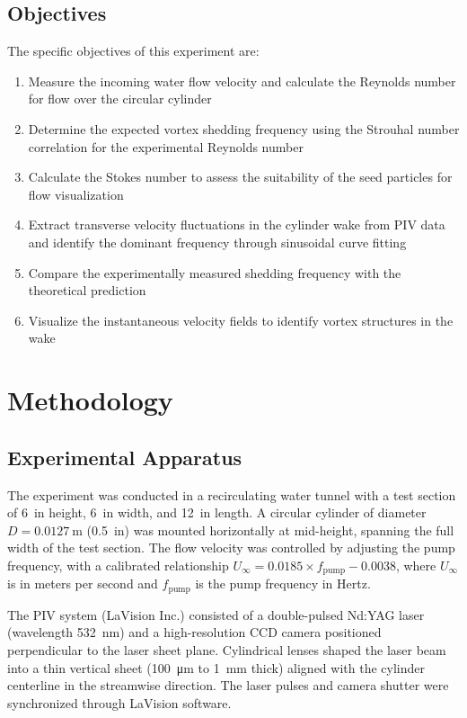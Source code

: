 \subsection{Objectives} \label{sec:introduction/objectives}

The specific objectives of this experiment are:
\begin{enumerate}
    \item Measure the incoming water flow velocity and calculate the Reynolds number for flow over the circular cylinder
    \item Determine the expected vortex shedding frequency using the Strouhal number correlation for the experimental Reynolds number
    \item Calculate the Stokes number to assess the suitability of the seed particles for flow visualization
    \item Extract transverse velocity fluctuations in the cylinder wake from PIV data and identify the dominant frequency through sinusoidal curve fitting
    \item Compare the experimentally measured shedding frequency with the theoretical prediction
    \item Visualize the instantaneous velocity fields to identify vortex structures in the wake
\end{enumerate}

\section{Methodology} \label{sec:methodology}

\subsection{Experimental Apparatus} \label{sec:methodology/apparatus}

The experiment was conducted in a recirculating water tunnel with a test section of \SI{6}{in} height, \SI{6}{in} width, and \SI{12}{in} length. A circular cylinder of diameter \(D = \SI{0.0127}{\meter}\) (\SI{0.5}{in}) was mounted horizontally at mid-height, spanning the full width of the test section. The flow velocity was controlled by adjusting the pump frequency, with a calibrated relationship \(U_\infty = 0.0185 \times f_{\text{pump}} - 0.0038\), where \(U_\infty\) is in meters per second and \(f_{\text{pump}}\) is the pump frequency in Hertz.

The PIV system (LaVision Inc.) consisted of a double-pulsed Nd:YAG laser (wavelength \SI{532}{\nano\meter}) and a high-resolution CCD camera positioned perpendicular to the laser sheet plane. Cylindrical lenses shaped the laser beam into a thin vertical sheet (\SI{100}{\micro\meter} to \SI{1}{\milli\meter} thick) aligned with the cylinder centerline in the streamwise direction. The laser pulses and camera shutter were synchronized through LaVision software.


